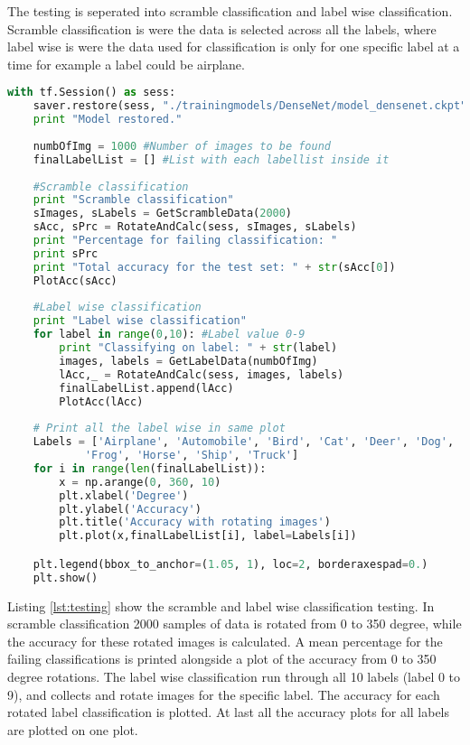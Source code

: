 The testing is seperated into scramble classification and label wise classification. Scramble classification is were the data is selected across all the labels, where label wise is were the data used for classification is only for one specific label at a time for example a label could be airplane.

\begin{lstlisting}[language=Python, label=lst:testing, caption=Testing the classification abilities for the model]
with tf.Session() as sess:
    saver.restore(sess, "./trainingmodels/DenseNet/model_densenet.ckpt")
    print "Model restored."
    
    numbOfImg = 1000 #Number of images to be found
    finalLabelList = [] #List with each labellist inside it
    
    #Scramble classification
    print "Scramble classification"
    sImages, sLabels = GetScrambleData(2000)
    sAcc, sPrc = RotateAndCalc(sess, sImages, sLabels)
    print "Percentage for failing classification: "
    print sPrc
    print "Total accuracy for the test set: " + str(sAcc[0])
    PlotAcc(sAcc)
    
    #Label wise classification
    print "Label wise classification"
    for label in range(0,10): #Label value 0-9
        print "Classifying on label: " + str(label)
        images, labels = GetLabelData(numbOfImg)
        lAcc,_ = RotateAndCalc(sess, images, labels)
        finalLabelList.append(lAcc)
        PlotAcc(lAcc)
    
    # Print all the label wise in same plot
    Labels = ['Airplane', 'Automobile', 'Bird', 'Cat', 'Deer', 'Dog', 
    		'Frog', 'Horse', 'Ship', 'Truck']
    for i in range(len(finalLabelList)):
        x = np.arange(0, 360, 10)
        plt.xlabel('Degree')
        plt.ylabel('Accuracy')
        plt.title('Accuracy with rotating images')
        plt.plot(x,finalLabelList[i], label=Labels[i])

    plt.legend(bbox_to_anchor=(1.05, 1), loc=2, borderaxespad=0.)
    plt.show()
\end{lstlisting}

Listing \ref{lst:testing} show the scramble and label wise classification testing. In scramble classification 2000 samples of data is rotated from 0 to 350 degree, while the accuracy for these rotated images is calculated. A mean percentage for the failing classifications is printed alongside a plot of the accuracy from 0 to 350 degree rotations. The label wise classification run through all 10 labels (label 0 to 9), and collects and rotate images for the specific label. The accuracy for each rotated label classification is plotted. At last all the accuracy plots for all labels are plotted on one plot.

